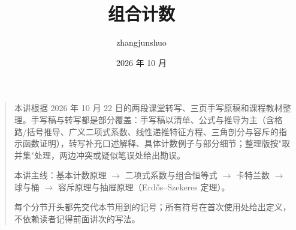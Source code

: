 \documentclass[UTF8,a4paper,11pt]{ctexart}
\title{组合计数}\author{zhangjunshuo}\date{2026 年 10 月}
\begin{document}
\maketitle
\begin{quote}
本讲根据 2026 年 10 月 22 日的两段课堂转写、三页手写原稿和课程教材整理。手写稿与转写都是部分覆盖：手写稿以清单、公式与推导为主（含格路/括号推导、广义二项式系数、线性递推特征方程、三角剖分与容斥的指示函数证明），转写补充口述解释、具体计数例子与部分细节；整理版按"取并集"处理，两边冲突或疑似笔误处给出勘误。

本讲主线：基本计数原理 $\to$ 二项式系数与组合恒等式 $\to$ 卡特兰数 $\to$ 球与桶 $\to$ 容斥原理与抽屉原理（Erdős--Szekeres 定理）。

每个分节开头都先交代本节用到的记号；所有符号在首次使用处给出定义，不依赖读者记得前面讲次的写法。
\end{quote}
\tableofcontents\clearpage






\end{document}
